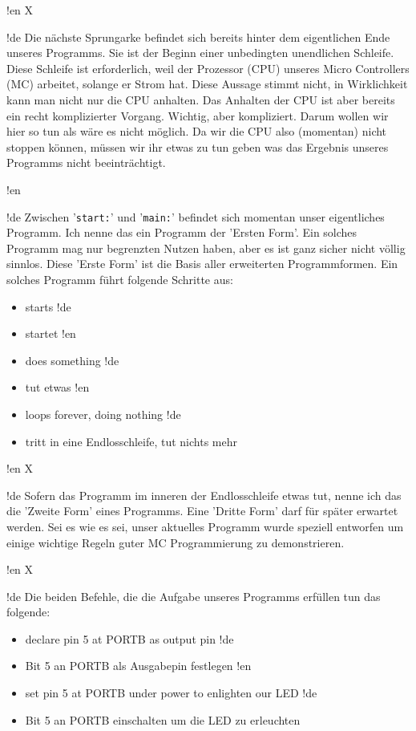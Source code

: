 !en X

!de Die nächste Sprungarke befindet sich bereits hinter dem eigentlichen Ende unseres Programms. Sie ist der Beginn einer unbedingten unendlichen Schleife. Diese Schleife ist erforderlich, weil der Prozessor (CPU) unseres Micro Controllers (MC) arbeitet, solange er Strom hat. Diese Aussage stimmt nicht, in Wirklichkeit kann man nicht nur die CPU anhalten. Das Anhalten der CPU ist aber bereits ein recht komplizierter Vorgang. Wichtig, aber kompliziert. Darum wollen wir hier so tun als wäre es nicht möglich. Da wir die CPU also (momentan) nicht stoppen können, müssen wir ihr etwas zu tun geben was das Ergebnis unseres Programms nicht beeinträchtigt.



!en 

!de Zwischen '\texttt{start:}' und '\texttt{main:}' befindet sich momentan unser eigentliches Programm. Ich nenne das ein Programm der 'Ersten Form'. Ein solches Programm mag nur begrenzten Nutzen haben, aber es ist ganz sicher nicht völlig sinnlos. Diese 'Erste Form' ist die Basis aller erweiterten Programmformen. Ein solches Programm führt folgende Schritte aus:

\begin{itemize}
!en   \item  starts
!de   \item  startet
!en   \item  does something
!de   \item  tut etwas
!en   \item  loops forever, doing nothing
!de   \item  tritt in eine Endlosschleife, tut nichts mehr
\end{itemize}



!en X

!de Sofern das Programm im inneren der Endlosschleife etwas tut, nenne ich das die 'Zweite Form' eines Programms. Eine 'Dritte Form' darf für später erwartet werden. Sei es wie es sei, unser aktuelles Programm wurde speziell entworfen um einige wichtige Regeln guter MC Programmierung zu demonstrieren.



!en X

!de Die beiden Befehle, die die Aufgabe unseres Programms erfüllen tun das folgende:

\begin{itemize}
!en   \item  declare pin 5 at PORTB as output pin
!de   \item  Bit 5 an PORTB als Ausgabepin festlegen
!en   \item  set pin 5 at PORTB under power to enlighten our LED
!de   \item  Bit 5 an PORTB einschalten um die LED zu erleuchten
\end{itemize}

